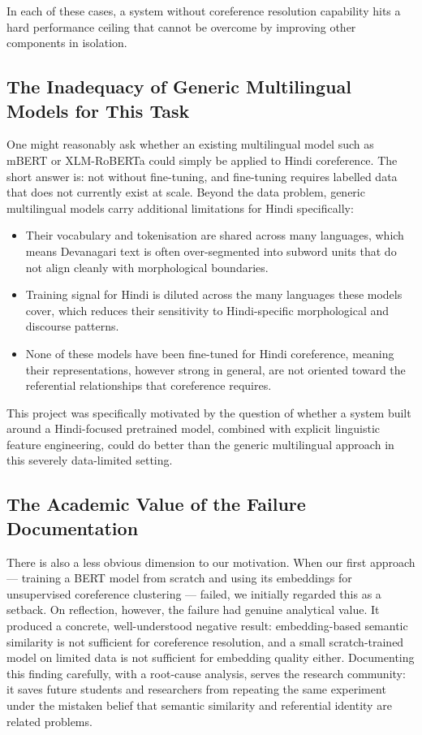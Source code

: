 \documentclass[12pt,a4paper]{report}
\begin{document}
In each of these cases, a system without coreference resolution capability hits a hard performance ceiling that cannot be overcome by improving other components in isolation.

\subsection{The Inadequacy of Generic Multilingual Models for This Task}

One might reasonably ask whether an existing multilingual model such as mBERT or XLM-RoBERTa could simply be applied to Hindi coreference. The short answer is: not without fine-tuning, and fine-tuning requires labelled data that does not currently exist at scale. Beyond the data problem, generic multilingual models carry additional limitations for Hindi specifically:

\begin{itemize}
    \item Their vocabulary and tokenisation are shared across many languages, which means Devanagari text is often over-segmented into subword units that do not align cleanly with morphological boundaries.
    \item Training signal for Hindi is diluted across the many languages these models cover, which reduces their sensitivity to Hindi-specific morphological and discourse patterns.
    \item None of these models have been fine-tuned for Hindi coreference, meaning their representations, however strong in general, are not oriented toward the referential relationships that coreference requires.
\end{itemize}

This project was specifically motivated by the question of whether a system built around a Hindi-focused pretrained model, combined with explicit linguistic feature engineering, could do better than the generic multilingual approach in this severely data-limited setting.

\subsection{The Academic Value of the Failure Documentation}

There is also a less obvious dimension to our motivation. When our first approach --- training a BERT model from scratch and using its embeddings for unsupervised coreference clustering --- failed, we initially regarded this as a setback. On reflection, however, the failure had genuine analytical value. It produced a concrete, well-understood negative result: embedding-based semantic similarity is not sufficient for coreference resolution, and a small scratch-trained model on limited data is not sufficient for embedding quality either. Documenting this finding carefully, with a root-cause analysis, serves the research community: it saves future students and researchers from repeating the same experiment under the mistaken belief that semantic similarity and referential identity are related problems.
\end{document}
